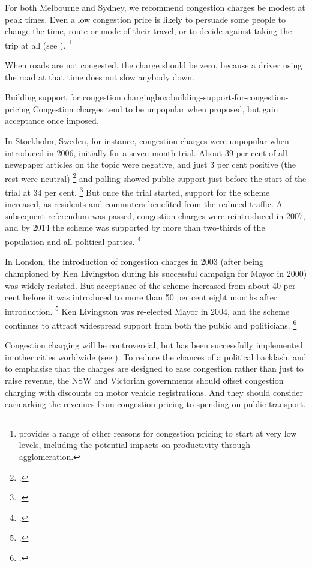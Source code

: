 \documentclass{grattan}
\begin{document}
For both Melbourne and Sydney, we recommend congestion charges be modest at peak times. Even a low congestion price is likely to persuade some people to change the time, route or mode of their travel, or to decide against taking the trip at all (see ).%
\footnote{\textcite{Arnott-Alternatives-to-road-pricing} provides a range of other reasons for congestion pricing to start at very low levels, including the potential impacts on productivity through agglomeration.}

When roads are not congested, the charge should be zero, because a driver using the road at that time does not slow anybody down.


\begin{smallbox}{Building support for congestion charging}{box:building-support-for-congestion-pricing}
Congestion charges tend to be unpopular when proposed, but gain acceptance once imposed.

In Stockholm, Sweden, for instance, congestion charges were unpopular when introduced in 2006, initially for a seven‐month trial.
About 39 per cent of all newspaper articles on the topic were negative, and just 3 per cent positive (the rest were neutral)
    \footcite{congestion-stockholm-trial}
and polling showed public support just before the start of the trial at 34 per cent.
    \footcite{The-Stokholm-Congestion-Charge}
But once the trial started, support for the scheme increased, as residents and commuters benefited from the reduced traffic.
A subsequent referendum was passed, congestion charges were reintroduced in 2007, and by 2014 the scheme was supported by more than two-thirds of the population and all political parties.%
\footcite{The-Stokholm-Congestion-Charge}

In London, the introduction of congestion charges in 2003 (after being championed by Ken Livingston during his successful campaign for Mayor in 2000) was widely resisted.
But acceptance of the scheme increased from about 40 per cent before it was introduced to more than 50 per cent eight months after introduction.%
\footcite{Bhatt-London-Congestion-Charge} Ken Livingston was re-elected Mayor in 2004, and the scheme continues to attract widespread support from both the public and politicians.%
\footcite{The-London-Congestion-Charge}
\end{smallbox}

Congestion charging will be controversial, but has been successfully implemented in other cities worldwide (see ).
To reduce the chances of a political backlash, and to emphasise that the charges are designed to ease congestion rather than just to raise revenue, the NSW and Victorian governments should offset congestion charging with discounts on motor vehicle registrations.
And they should consider earmarking the revenues from congestion pricing to spending on public transport.
\end{document}
